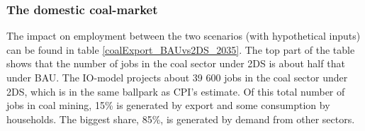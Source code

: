 \documentclass[12pt,english]{article}
\begin{document}

\subsubsection{The domestic coal-market}

The impact on employment between the two scenarios (with hypothetical inputs) can be found in table \ref{coalExport_BAUvs2DS_2035}. The top part of the table shows that the number of jobs in the coal sector under 2DS is about half that under BAU. The IO-model projects about 39 600 jobs in the coal sector under 2DS, which is in the same ballpark as CPI's estimate. Of this total number of jobs in coal mining, 15\% is generated by export and some consumption by households. The biggest share, 85\%, is generated by demand from other sectors. 
\end{document}
